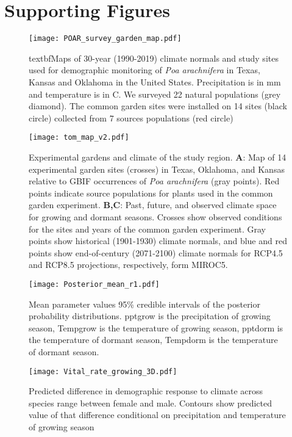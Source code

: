 \documentclass[9pt,twoside,lineno]{pnas-new}
\newcommand{\revise}[1]{{\color{Mahogany}{#1}}}
\begin{document}
\section*{Supporting Figures}
\begin{figure}[H]
\centering
\texttt{[image: POAR\_survey\_garden\_map.pdf]}
\caption{textbf{Maps of 30-year (1990-2019) climate normals and study sites used for demographic monitoring of \emph{Poa arachnifera} in Texas, Kansas and Oklahoma in the United States}.
 Precipitation is in mm and temperature is in \degree  C.
 We surveyed 22 natural populations (grey diamond).
 The common garden sites were installed on 14 sites (black circle) collected from 7 sources populations (red circle)}
 \label{Sup:long_lat_garden}
\end{figure}
\clearpage

\begin{figure}
\centering
\texttt{[image: tom\_map\_v2.pdf]}
\caption{ Experimental gardens and climate of the study region. 
  	\textbf{A}: Map of 14 experimental garden sites (crosses) in Texas, Oklahoma, and Kansas relative to GBIF occurrences of \textit{Poa arachnifera} (gray points). Red points indicate source populations for plants used in the common garden experiment. 
  	\textbf{B,C}: Past, future, and observed climate space for growing and dormant seasons. Crosses show observed conditions for the sites and years of the common garden experiment. Gray points show historical (1901-1930) climate normals, and blue and red points show end-of-century (2071-2100) climate normals for RCP4.5 and RCP8.5 projections, respectively, form MIROC5.
}
\label{Sup:climate_variation1}
\end{figure}
\clearpage

\begin{figure}
\centering
\texttt{[image: Posterior\_mean\_r1.pdf]}
\caption{Mean parameter values\revise{, 50\% and} 95\% credible intervals of the posterior probability distributions. 
		pptgrow is  the precipitation of growing season,
		Tempgrow is the temperature of growing season,
		pptdorm is the temperature of dormant season,
		Tempdorm is the temperature of dormant season.
		}
\label{Sup:Posterior}
\end{figure}
\clearpage

\begin{figure}
\centering
\texttt{[image: Vital\_rate\_growing\_3D.pdf]}
\caption{ Predicted difference in demographic response to climate across species range between female and male. Contours show predicted value of that difference conditional on precipitation and temperature of  growing season }
\label{Sup:vt_3D_grow}
\end{figure}
\clearpage
\end{document}
